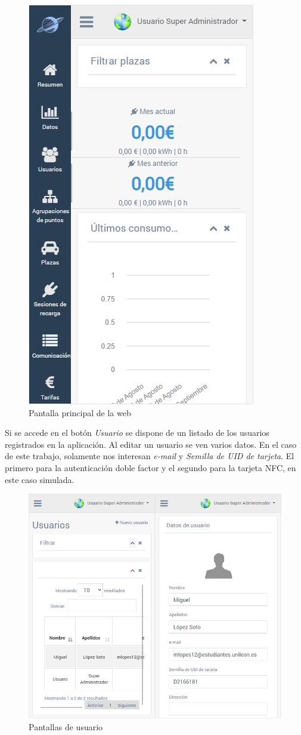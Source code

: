 \documentclass[12pt,a4paper,onecolumn,oneside]{report}
\begin{document}
\begin{figure}[H] 
\centering
  \includegraphics[width=.5\textwidth]{figuras/design2.png}
  \caption[Pantalla principal de la web]{Pantalla principal de la web\\
  }
  \label{fig:design2}
\end{figure}

Si se accede en el botón \textit{Usuario} se dispone de un listado de los usuarios registrados en la aplicación. Al editar un usuario se ven varios datos. En el caso de este trabajo, solamente nos interesan \textit{e-mail} y \textit{Semilla de UID de tarjeta}. El primero para la autenticación doble factor y el segundo para la tarjeta NFC, en este caso simulada.

\begin{figure}[H] 
\centering
  \includegraphics[width=1\textwidth]{figuras/design3.png}
  \caption[Pantallas de usuario]{Pantallas de usuario\\
  }
  \label{fig:design3}
\end{figure}
\end{document}
